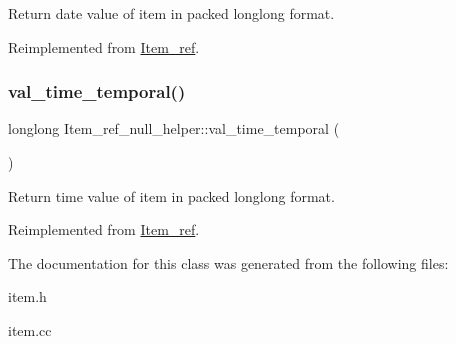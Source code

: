 Return date value of item in packed longlong format. 

Reimplemented from \mbox{\hyperlink{classItem__ref_a749f7427b60d23f3f50a6651dcc3abf6}{Item\+\_\+ref}}.

\mbox{\label{classItem__ref__null__helper_a310f77154e5867053304bd27d75cbb53}} 
\subsubsection{\texorpdfstring{val\+\_\+time\+\_\+temporal()}{val\_time\_temporal()}}
{\footnotesize\ttfamily longlong Item\+\_\+ref\+\_\+null\+\_\+helper\+::val\+\_\+time\+\_\+temporal (\begin{DoxyParamCaption}{ }\end{DoxyParamCaption})\hspace{0.3cm}{\ttfamily [virtual]}}

Return time value of item in packed longlong format. 

Reimplemented from \mbox{\hyperlink{classItem__ref_a962c929d6871099e06c7aa2868f09779}{Item\+\_\+ref}}.



The documentation for this class was generated from the following files\+:\begin{DoxyCompactItemize}
\item 
item.\+h\item 
item.\+cc\end{DoxyCompactItemize}
